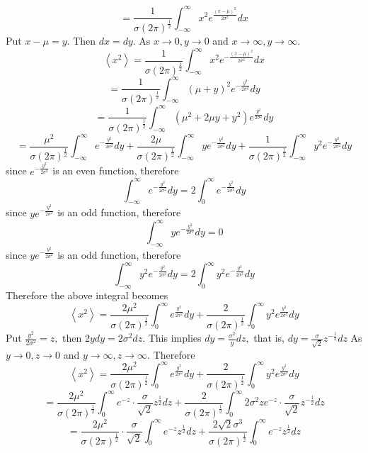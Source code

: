 \documentclass{styles/kaobook}
\begin{document}
$$
=\frac{1}{\sigma(2 \pi)^{\frac{1}{2}}} \int_{-\infty}^{\infty} x^{2} e^{\frac{(x-\mu)^{2}}{2 \sigma^{2}}} d x
$$
Put $x-\mu=y .$ Then $d x=d y .$ As $x \rightarrow 0, y \rightarrow 0$ and $x \rightarrow \infty, y \rightarrow \infty$.
$$
\left\langle x^{2}\right\rangle=\frac{1}{\sigma(2 \pi)^{\frac{1}{2}}} \int_{-\infty}^{\infty} x^{2} e^{-\frac{(x-\mu)^{2}}{2 \sigma^{2}}} d x
$$
$$
=\frac{1}{\sigma(2 \pi)^{\frac{1}{2}}} \int_{-\infty}^{\infty}(\mu+y)^{2} e^{-\frac{y^{2}}{2 \sigma^{2}}} d y
$$
$$
=\frac{1}{\sigma(2 \pi)^{\frac{1}{2}}} \int_{-\infty}^{\infty}\left(\mu^{2}+2 \mu y+y^{2}\right) e^{\frac{y^{2}}{2 \sigma^{2}}} d y
$$
$$
=\frac{\mu^{2}}{\sigma(2 \pi)^{\frac{1}{2}}} \int_{-\infty}^{\infty} e^{-\frac{y^{2}}{2 \sigma^{2}}} d y+\frac{2 \mu}{\sigma(2 \pi)^{\frac{1}{2}}} \int_{-\infty}^{\infty} y e^{-\frac{y^{2}}{2 \sigma^{2}}} d y+\frac{1}{\sigma(2 \pi)^{\frac{1}{2}}} \int_{-\infty}^{\infty} y^{2} e^{-\frac{y^{2}}{2 \sigma^{2}}} d y
$$
since $e^{-\frac{y^{2}}{2 \sigma^{2}}}$ is an even function, therefore
$$
\int_{-\infty}^{\infty} e^{-\frac{y^{2}}{2 \sigma^{2}}} d y=2 \int_{0}^{\infty} e^{-\frac{y^{2}}{2 \sigma^{2}}} d y
$$
since $y e^{-\frac{y^{2}}{2 \sigma^{2}}}$ is an odd function, therefore
$$
\int_{-\infty}^{\infty} y e^{-\frac{y^{2}}{2 \sigma^{2}}} d y=0
$$
since $y e^{-\frac{y^{2}}{2 \sigma^{2}}}$ is an odd function, therefore
$$
\int_{-\infty}^{\infty} y^{2} e^{-\frac{y^{2}}{2 \sigma^{2}}} d y=2 \int_{0}^{\infty} y^{2} e^{-\frac{y^{2}}{2 \sigma^{2}}} d y
$$
Therefore the above integral becomes
$$
\left\langle x^{2}\right\rangle=\frac{2 \mu^{2}}{\sigma(2 \pi)^{\frac{1}{2}}} \int_{0}^{\infty} e^{\frac{y^{2}}{2 \sigma^{2}}} d y+\frac{2}{\sigma(2 \pi)^{\frac{1}{2}}} \int_{0}^{\infty} y^{2} e^{\frac{y^{2}}{2 \sigma^{2}}} d y
$$
Put $\frac{y^{2}}{2 \sigma^{2}}=z,$ then $2 y d y=2 \sigma^{2} d z$. This implies $d y=\frac{\sigma^{2}}{y} d z,$ that is, $d y=\frac{\sigma}{\sqrt{2}} z^{-\frac{1}{2}} d z$
As $y \rightarrow 0, z \rightarrow 0$ and $y \rightarrow \infty, z \rightarrow \infty$. Therefore
$$\left\langle x^{2}\right\rangle=\frac{2 \mu^{2}}{\sigma(2 \pi)^{\frac{1}{2}}} \int_{0}^{\infty} e^{\frac{y^{2}}{2 \sigma^{2}}} d y+\frac{2}{\sigma(2 \pi)^{\frac{1}{2}}} \int_{0}^{\infty} y^{2} e^{\frac{y^{2}}{2 \sigma^{2}}} d y$$
$$=\frac{2 \mu^{2}}{\sigma(2 \pi)^{\frac{1}{2}}} \int_{0}^{\infty} e^{-z} \cdot \frac{\sigma}{\sqrt{2}} z^{\frac{1}{2}} d z+\frac{2}{\sigma(2 \pi)^{\frac{1}{2}}} \int_{0}^{\infty} 2 \sigma^{2} z e^{-z} \cdot \frac{\sigma}{\sqrt{2}} z^{-\frac{1}{2}} d z$$
$$=\frac{2 \mu^{2}}{\sigma(2 \pi)^{\frac{1}{2}}} \cdot \frac{\sigma}{\sqrt{2}} \int_{0}^{\infty} e^{-z} z^{\frac{1}{2}} d z+\frac{2 \sqrt{2} \sigma^{3}}{\sigma(2 \pi)^{\frac{1}{2}}} \int_{0}^{\infty} e^{-z} z^{\frac{1}{2}} d z$$
\end{document}
